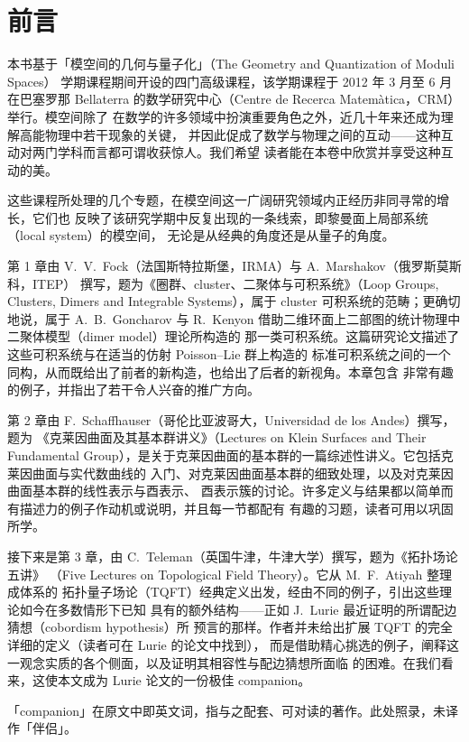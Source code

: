 \chapter*{前言}

本书基于「模空间的几何与量子化」（The Geometry and Quantization of Moduli Spaces）
学期课程期间开设的四门高级课程，该学期课程于 2012 年 3 月至 6 月在巴塞罗那
Bellaterra 的数学研究中心（Centre de Recerca Matemàtica，CRM）举行。模空间除了
在数学的许多领域中扮演重要角色之外，近几十年来还成为理解高能物理中若干现象的关键，
并因此促成了数学与物理之间的互动——这种互动对两门学科而言都可谓收获惊人。我们希望
读者能在本卷中欣赏并享受这种互动的美。

这些课程所处理的几个专题，在模空间这一广阔研究领域内正经历非同寻常的增长，它们也
反映了该研究学期中反复出现的一条线索，即黎曼面上局部系统（local system）的模空间，
无论是从经典的角度还是从量子的角度。

第 1 章由 V.~V.~Fock（法国斯特拉斯堡，IRMA）与 A.~Marshakov（俄罗斯莫斯科，ITEP）
撰写，题为《圈群、cluster、二聚体与可积系统》（Loop Groups, Clusters, Dimers and
Integrable Systems），属于 cluster 可积系统的范畴；更确切地说，属于 A.~B.~Goncharov
与 R.~Kenyon 借助二维环面上二部图的统计物理中二聚体模型（dimer model）理论所构造的
那一类可积系统。这篇研究论文描述了这些可积系统与在适当的仿射 Poisson--Lie 群上构造的
标准可积系统之间的一个同构，从而既给出了前者的新构造，也给出了后者的新视角。本章包含
非常有趣的例子，并指出了若干令人兴奋的推广方向。

第 2 章由 F.~Schaffhauser（哥伦比亚波哥大，Universidad de los Andes）撰写，题为
《克莱因曲面及其基本群讲义》（Lectures on Klein Surfaces and Their Fundamental
Group），是关于克莱因曲面的基本群的一篇综述性讲义。它包括克莱因曲面与实代数曲线的
入门、对克莱因曲面基本群的细致处理，以及对克莱因曲面基本群的线性表示与酉表示、
酉表示簇的讨论。许多定义与结果都以简单而有描述力的例子作动机或说明，并且每一节都配有
有趣的习题，读者可用以巩固所学。

接下来是第 3 章，由 C.~Teleman（英国牛津，牛津大学）撰写，题为《拓扑场论五讲》
（Five Lectures on Topological Field Theory）。它从 M.~F.~Atiyah 整理成体系的
拓扑量子场论（TQFT）经典定义出发，经由不同的例子，引出这些理论如今在多数情形下已知
具有的额外结构——正如 J.~Lurie 最近证明的所谓配边猜想（cobordism hypothesis）所
预言的那样。作者并未给出扩展 TQFT 的完全详细的定义（读者可在 Lurie 的论文中找到），
而是借助精心挑选的例子，阐释这一观念实质的各个侧面，以及证明其相容性与配边猜想所面临
的困难。在我们看来，这使本文成为 Lurie 论文的一份极佳 companion。
\begin{annote}
「companion」在原文中即英文词，指与之配套、可对读的著作。此处照录，未译作「伴侣」。
\end{annote}

